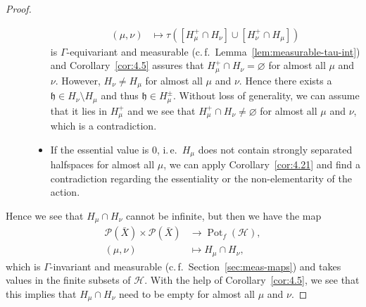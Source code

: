 \begin{proof}
\begin{description}
\begin{itemize}
\begin{align*}
        (\mu,\nu) &\mapsto \tau([H_\mu^+ \cap H_\nu] \cup [H_\nu^+ \cap H_\mu])
      \end{align*}
      is \(\Gamma\)-equivariant and measurable (c.\,f.\ Lemma~\ref{lem:measurable-tau-int}) and Corollary~\ref{cor:4.5} assures that \(H_\mu^+ \cap H_\nu = \varnothing\) for almost all \(\mu\) and \(\nu\). However, \(H_\nu \neq H_\mu\) for almost all \(\mu\) and \(\nu\). Hence there exists a \(\mathfrak{h} \in H_\nu \setminus H_\mu\) and thus \(\mathfrak{h} \in H_\mu^\pm\). Without loss of generality, we can assume that it lies in \(H_\mu^+\) and we see that \(H_\mu^+ \cap H_\nu \neq \varnothing\) for almost all \(\mu\) and \(\nu\), which is a contradiction.
    \item If the essential value is 0, i.\,e.\ \(H_\mu\) does not contain strongly separated halfspaces for almost all \(\mu\), we can apply Corollary~\ref{cor:4.21} and find a contradiction regarding the essentiality or the non-elementarity of the action.
    \end{itemize}
  \end{description}
  Hence we see that \(H_\mu \cap H_\nu\) cannot be infinite, but then we have the map
  \begin{align*}
    \mathcal{P}(\bar X) \times \mathcal{P}(\bar X) & \to \operatorname{Pot}_f(\mathcal{H}),\\
    (\mu,\nu) &\mapsto H_\mu \cap H_\nu,
  \end{align*}
  which is \(\Gamma\)-invariant and measurable (c.\,f.~Section~\ref{sec:meas-maps}) and takes values in the finite subsets of \(\mathcal{H}\). With the help of Corollary~\ref{cor:4.5}, we see that this implies that \(H_\mu \cap H_\nu\) need to be empty for almost all \(\mu\) and \(\nu\).


\end{proof}
